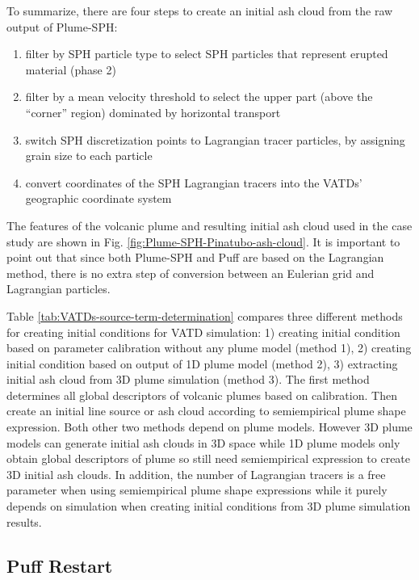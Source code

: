 \documentclass[utf8]{frontiersSCNS} %
\begin{document}
To summarize, there are four steps to create an initial ash cloud from the raw output of Plume-SPH:
\begin{enumerate}
\item filter by SPH particle type to select SPH particles that represent erupted material (phase 2)
\item filter by a mean velocity threshold to select the upper part (above the ``corner'' region) dominated by horizontal transport
\item switch SPH discretization points to Lagrangian tracer particles, by assigning grain size to each particle
\item convert coordinates of the SPH Lagrangian tracers into the VATDs' geographic coordinate system
\end{enumerate}
The features of the volcanic plume and resulting initial ash cloud used in the case study are shown in Fig. \ref{fig:Plume-SPH-Pinatubo-ash-cloud}. It is important to point out that since both Plume-SPH and Puff are based on the Lagrangian method, there is no extra step of conversion between an Eulerian grid and Lagrangian particles.

Table \ref{tab:VATDs-source-term-determination} compares three different methods for creating initial conditions for VATD simulation: 1) creating initial condition based on parameter calibration without any plume model (method 1), 2) creating initial condition based on output of 1D plume model (method 2), 3) extracting initial ash cloud from 3D plume simulation (method 3). The first method determines all global descriptors of volcanic plumes based on calibration. Then create an initial line source or ash cloud according to semiempirical plume shape expression. Both other two methods depend on plume models. However 3D plume models can generate initial ash clouds in 3D space while 1D plume models only obtain global descriptors of plume so still need semiempirical expression to create 3D initial ash clouds. In addition, the number of Lagrangian tracers is a free parameter when using semiempirical plume shape expressions while it purely depends on simulation when creating initial conditions from 3D plume simulation results.

\subsection{Puff Restart}
\end{document}
